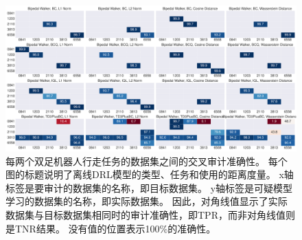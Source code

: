\begin{figure}[!ht]
    \includegraphics[width=\hsize]{figure/orl_auditor/overall_sac_bipedalwalker_20230130183936090.pdf}
    \caption{
    每两个双足机器人行走任务的数据集之间的交叉审计准确性。
    每个图的标题说明了离线DRL模型的类型、任务和使用的距离度量。
    x轴标签是要审计的数据集的名称，即目标数据集。
    y轴标签是可疑模型学习的数据集的名称，即实际数据集。
    因此，对角线值显示了实际数据集与目标数据集相同时的审计准确性，即TPR，而非对角线值则是TNR结果。
    没有值的位置表示100\%的准确性。
    }
    \label{fig:audit result on bipedalwalker}
\end{figure}
    
